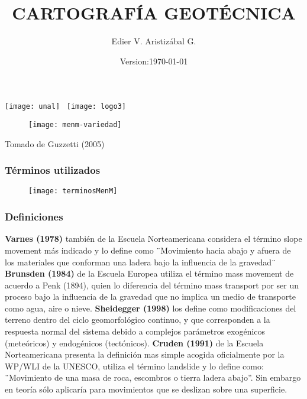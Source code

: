 \documentclass[12pt]{beamer}
\title[Movimientos en masa]{CARTOGRAFÍA GEOTÉCNICA}
\author[Edier Aristizábal]{Edier V. Aristizábal G.}
\institute{\emph{evaristizabalg@unal.edu.co}}
\date{Version:\today}
\begin{document}
\begin{frame}
\titlepage
\centering
\texttt{[image: unal]}\hspace*{4.75cm}~%
\texttt{[image: logo3]} 
\end{frame}
\begin{frame}
\begin{figure}
\centering
\texttt{[image: menm-variedad]} 
\end{figure}
\tiny{Tomado de Guzzetti (2005)}
\end{frame}
\begin{frame}
\frametitle{Términos utilizados}
\begin{figure}
\centering
\texttt{[image: terminosMenM]} 
\end{figure}
\end{frame}
\begin{frame}
\frametitle{Definiciones}
\scriptsize{
\textbf{Varnes (1978)} también de la Escuela Norteamericana considera el término slope movement más indicado y lo define como ¨Movimiento hacia abajo y afuera de los materiales que conforman una ladera bajo la influencia de la gravedad¨
\vfill
\textbf{Brunsden (1984)} de la Escuela Europea utiliza el término mass movement  de acuerdo a Penk (1894), quien lo diferencia del término mass transport por ser un proceso bajo la influencia de la gravedad que no implica un medio de transporte como agua, aire o nieve.
\vfill
\textbf{Sheidegger (1998)} los define como modificaciones del terreno dentro del ciclo geomorfológico continuo, y que corresponden a la respuesta normal del sistema debido a complejos parámetros exogénicos (meteóricos) y endogénicos (tectónicos).
\vfill
\textbf{Cruden (1991)} de la Escuela Norteamericana presenta la definición mas simple acogida oficialmente por la WP/WLI de la UNESCO, utiliza el término landslide y lo define como: ¨Movimiento de una masa de roca, escombros o tierra ladera abajo”. Sin embargo en teoría sólo aplicaría para movimientos que se deslizan sobre una superficie.
}
\end{frame}
\end{document}
